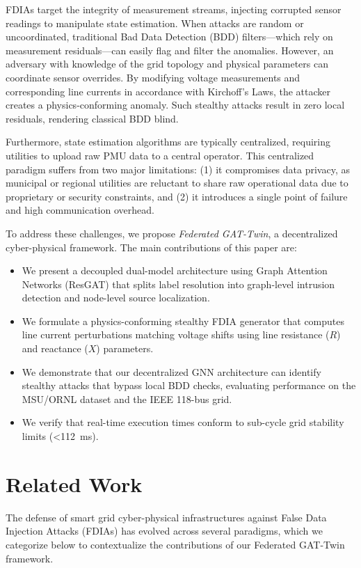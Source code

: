 \documentclass[conference]{IEEEtran}
\begin{document}
FDIAs target the integrity of measurement streams, injecting corrupted sensor readings to manipulate state estimation. When attacks are random or uncoordinated, traditional Bad Data Detection (BDD) filters—which rely on measurement residuals—can easily flag and filter the anomalies. However, an adversary with knowledge of the grid topology and physical parameters can coordinate sensor overrides. By modifying voltage measurements and corresponding line currents in accordance with Kirchoff's Laws, the attacker creates a physics-conforming anomaly. Such stealthy attacks result in zero local residuals, rendering classical BDD blind.

Furthermore, state estimation algorithms are typically centralized, requiring utilities to upload raw PMU data to a central operator. This centralized paradigm suffers from two major limitations: (1) it compromises data privacy, as municipal or regional utilities are reluctant to share raw operational data due to proprietary or security constraints, and (2) it introduces a single point of failure and high communication overhead.

To address these challenges, we propose \textit{Federated GAT-Twin}, a decentralized cyber-physical framework. The main contributions of this paper are:
\begin{itemize}
    \item We present a decoupled dual-model architecture using Graph Attention Networks (ResGAT) that splits label resolution into graph-level intrusion detection and node-level source localization.
    \item We formulate a physics-conforming stealthy FDIA generator that computes line current perturbations matching voltage shifts using line resistance ($R$) and reactance ($X$) parameters.
    \item We demonstrate that our decentralized GNN architecture can identify stealthy attacks that bypass local BDD checks, evaluating performance on the MSU/ORNL dataset and the IEEE 118-bus grid.
    \item We verify that real-time execution times conform to sub-cycle grid stability limits (<112~ms).
\end{itemize}

\section{Related Work}\label{sec:related_work}
The defense of smart grid cyber-physical infrastructures against False Data Injection Attacks (FDIAs) has evolved across several paradigms, which we categorize below to contextualize the contributions of our Federated GAT-Twin framework.
\end{document}
